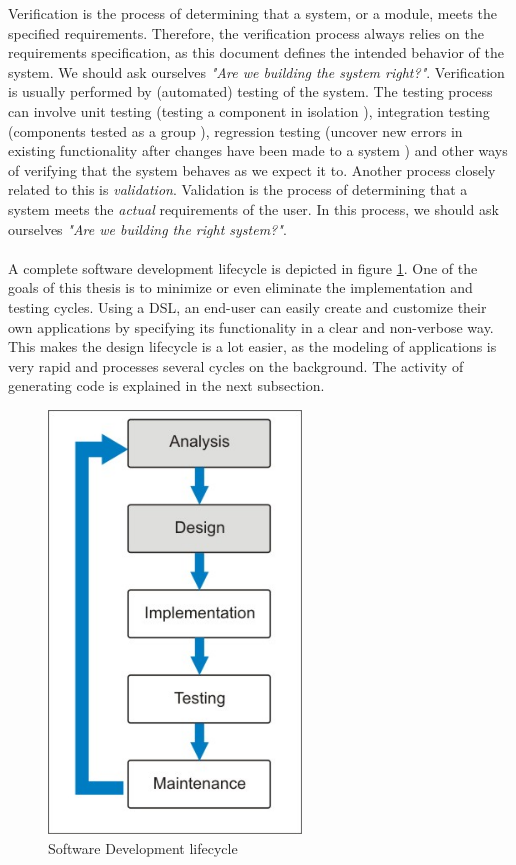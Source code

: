 Verification is the process of determining that a system, or a module, meets the specified requirements. Therefore, the verification process always relies on the requirements specification, as this document defines the intended behavior of the system. We should ask ourselves \textit{"Are we building the system right?"}. Verification is usually performed by (automated) testing of the system. The testing process can involve unit testing (testing a component in isolation \cite{UnitTesting}), integration testing (components tested as a group \cite{IntegrationTesting}), regression testing (uncover new errors in existing functionality after changes have been made to a system \cite{RegressionTesting}) and other ways of verifying that the system behaves as we expect it to. Another process closely related to this is \textit{validation}. Validation is the process of determining that a system meets the \textit{actual} requirements of the user. In this process, we should ask ourselves \textit{"Are we building the right system?"}.
\\ \\
A complete software development lifecycle is depicted in figure \ref{fig:lifecycle}. One of the goals of this thesis is to minimize or even eliminate the implementation and testing cycles. Using a DSL, an end-user can easily create and customize their own applications by specifying its functionality in a clear and non-verbose way. This makes the design lifecycle is a lot easier, as the modeling of applications is very rapid and processes several cycles on the background. The activity of generating code is explained in the next subsection.

\begin{figure}[htb]
\centering
\includegraphics[width=0.6\textwidth]{images/lifecycle.jpg}
\caption{Software Development lifecycle}
\label{fig:lifecycle}
\end{figure}

